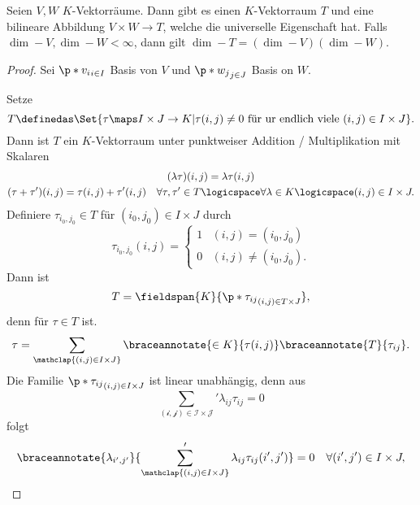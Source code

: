 \begin{satz}
  Seien \( V,W \) \( K \)-Vektorräume. Dann gibt es einen \( K \)-Vektorraum \( T \) und eine bilineare Abbildung \( V\times W\to T \), welche die universelle Eigenschaft \tensorproperty hat. Falls \( \dim-{V}, \dim-{W}<\infty \), dann gilt \( \dim-{T}=(\dim-{V})(\dim-{W}) \).
\end{satz}
\begin{proof}
  Sei \( \p*{v_i}_{i\in I} \) Basis von \( V \) und \( \p*{w_j}_{j\in J} \) Basis on \( W \).

  Setze
  \begin{equation*}
    T\definedas \Set{\tau\maps I\times J\to K|\tau(i,j)\neq 0 \text{ für ur endlich viele }(i,j)\in I\times J}.
  \end{equation*}
  Dann ist \( T \) ein \( K \)-Vektorraum unter punktweiser Addition / Multiplikation mit Skalaren
  \begin{gather*}
    (\lambda \tau)(i,j)=\lambda \tau(i,j)\\
    (\tau+\tau')(i,j)=\tau(i,j)+\tau'(i,j)\quad \forall \tau,\tau'\in T\logicspace \forall \lambda\in K\logicspace (i,j)\in I\times J.
  \end{gather*}
  Definiere \( \tau_{i_0,j_0}\in T \) für \( (i_0,j_0)\in I\times J \) durch
  \begin{equation*}
    \tau_{i_0,j_0}(i,j)=\begin{cases}
      1&(i,j)=(i_0,j_0)\\
      0&(i,j)\neq (i_0,j_0).
    \end{cases}
  \end{equation*}
  Dann ist
  \begin{equation*}
    T=\fieldspan{K}{\p*{\tau_{ij}}_{(i,j)\in T\times J}},
  \end{equation*}
  denn für \( \tau\in T \) ist.
  \begin{equation*}
    \tau=\sum_{\mathclap{(i,j)\in I\times J}}\braceannotate{\in K}{\tau(i,j)}\braceannotate{T}{\tau_{ij}}.
  \end{equation*}
  Die Familie \( \p*{\tau_{ij}}_{(i,j)\in I\times J} \) ist linear unabhängig, denn aus
  \begin{equation*}
    \sum_{\mathcal{(i,j)\in I\times J}}'\lambda_{ij}\tau_{ij}=0
  \end{equation*}
  folgt
  \begin{equation*}
    \braceannotate{\lambda_{i',j'}}{\sum_{\mathclap{(i,j)\in I\times J}}'\lambda_{ij}\tau_{ij}(i',j')}=0\quad \forall (i',j')\in I\times J,
  \end{equation*}

\end{proof}
